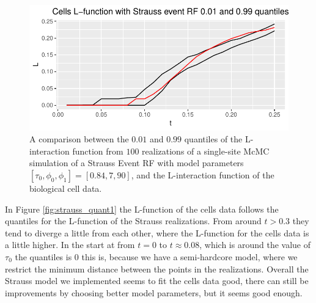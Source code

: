 \begin{figure}
    \centering
    \includegraphics[scale=0.9]{figures/strauss_quant2.pdf}
    \caption{A comparison between the $0.01$ and $0.99$ quantiles of the L-interaction function from $100$ realizations of a single-site McMC simulation of a Strauss Event RF with model parameters $[\tau_0,\phi_0,\phi_1] = [0.84,7,90]$, and the L-interaction function of the biological cell data.}
    \label{fig:strauss_quant2}
\end{figure}

In Figure \ref{fig:strauss_quant1} the L-function of the cells data follows the quantiles for the L-function of the Strauss realizations. From around $t>0.3$ they tend to diverge a little from each other, where the L-function for the cells data is a little higher. In the start at from $t=0$ to $t\approx 0.08$, which is around the value of $\tau_0$ the quantiles is $0$ this is, because we have a semi-hardcore model, where we restrict the minimum distance between the points in the realizations. Overall the Strauss model we implemented seems to fit the cells data good, there can still be improvements by choosing better model parameters, but it seems good enough.